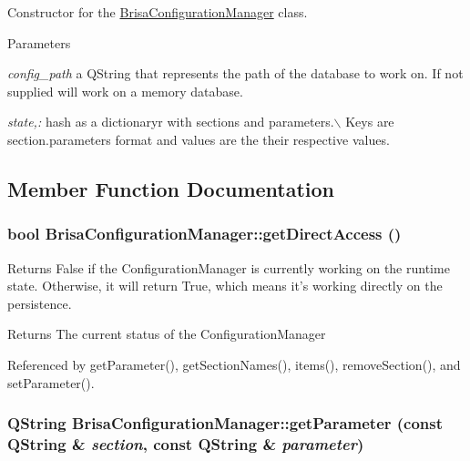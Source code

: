 Constructor for the \hyperlink{classBrisaCore_1_1BrisaConfigurationManager}{BrisaConfigurationManager} class. 
\begin{DoxyParams}{Parameters}
\item[{\em config\_\-path}]a QString that represents the path of the database to work on. If not supplied will work on a memory database. \item[{\em state,:}]hash as a dictionaryr with sections and parameters.$\backslash$ Keys are section.parameters format and values are the their respective values. \end{DoxyParams}


\subsection{Member Function Documentation}
\hypertarget{classBrisaCore_1_1BrisaConfigurationManager_aa32b2a7e909192182c879c72c047d895}{
\subsubsection[{getDirectAccess}]{\setlength{\rightskip}{0pt plus 5cm}bool BrisaConfigurationManager::getDirectAccess ()}}
\label{classBrisaCore_1_1BrisaConfigurationManager_aa32b2a7e909192182c879c72c047d895}


Returns False if the ConfigurationManager is currently working on the runtime state. Otherwise, it will return True, which means it's working directly on the persistence. \begin{DoxyReturn}{Returns}
The current status of the ConfigurationManager 
\end{DoxyReturn}


Referenced by getParameter(), getSectionNames(), items(), removeSection(), and setParameter().\hypertarget{classBrisaCore_1_1BrisaConfigurationManager_abdfdf034b2bd536aa85cf3ecfc2c5f07}{
\subsubsection[{getParameter}]{\setlength{\rightskip}{0pt plus 5cm}QString BrisaConfigurationManager::getParameter (const QString \& {\em section}, \/  const QString \& {\em parameter})}}
\label{classBrisaCore_1_1BrisaConfigurationManager_abdfdf034b2bd536aa85cf3ecfc2c5f07}


